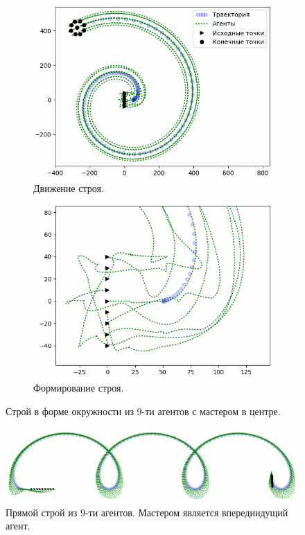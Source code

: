 \documentclass[a4paper, 14pt]{extarticle}
\begin{document}
\begin{figure}[!htbp]
	\centering
	\begin{subfigure}{.5\textwidth}
		\centering
		\includegraphics[width=1\linewidth]{others/circle-platoon}
		\caption{Движение строя.}
		\label{fig:circle-platoon-all}
	\end{subfigure}%
	\begin{subfigure}{.5\textwidth}
		\centering
		\includegraphics[width=1\linewidth]{others/circle-platoon-zoom1}
		\caption{Формирование строя.}
		\label{fig:circle-platoon-zoom1}
	\end{subfigure}
	\caption{Строй в форме окружности из 9-ти агентов с мастером в центре.}
	\label{fig:circle-platoon}
\end{figure}
\begin{figure}
	\centering
	\includegraphics[width=1\linewidth]{platoon/line-platoon-cropped}
	\caption{Прямой строй из 9-ти агентов. Мастером является впередиидущий агент.}
	\label{fig:line-platoon-cropped}
\end{figure}
\end{document}
